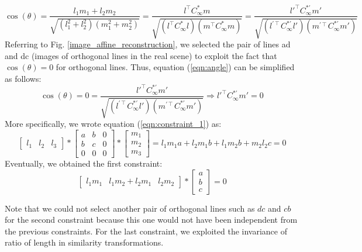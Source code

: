 \documentclass[11pt, oneside]{article}
\begin{document}
\begin{equation}
	\label{eqn:angle}
	\cos(\theta) = \frac{l_1 m_1 + l_2  m_2}{\sqrt{(l_1^2 + l_2^2)(m_1^2 + m_2 ^2)}}
	=
	\frac{l^\intercal C^{*}_\infty m}{\sqrt{(l^\intercal C^{*}_\infty l)(m^\intercal C^{*}_\infty m)}} 
	= 
	\frac{l{'^\intercal} C^{*'}_\infty m'}{\sqrt{(l^{'\intercal} C^{*'}_\infty l')(m^{'\intercal} C^{*'}_\infty m')}}
\end{equation}
Referring to Fig. \ref{image_affine_reconstruction}, we selected the pair of lines ad and dc (images of orthogonal lines in the real scene) to exploit the fact that $\cos(\theta) = 0$ for orthogonal lines. Thus, equation (\ref{eqn:angle}) can be simplified as follows:
\begin{equation}
	\label{eqn:constraint_1}
	\cos(\theta) = 0 =
	\frac{l{'^\intercal} C^{*'}_\infty m'}{\sqrt{(l^{'\intercal} C^{*'}_\infty l')(m^{'\intercal} C^{*'}_\infty m')}} 
	\Rightarrow
	l{'^\intercal} C^{*'}_\infty m' = 0
\end{equation}
More specifically, we wrote equation (\ref{eqn:constraint_1}) as:
\begin{equation}
	\begin{bmatrix}
		l_1 & l_2 & l_3
	\end{bmatrix}
	*
	\begin{bmatrix}
		a & b & 0 \\ b & c & 0 \\ 0 & 0 & 0
	\end{bmatrix} *
	\begin{bmatrix}
		m_1 \\ m_2 \\ m_3
	\end{bmatrix}
	= l_1 m_1 a + l_2 m_1 b + l_1 m_2 b + m_2 l_2 c = 0
\end{equation}
Eventually, we obtained the first constraint:
\begin{equation}
	\begin{bmatrix}
		l_1 m_1 & l_1 m_2 + l_2 m_1 & l_2 m_2
	\end{bmatrix}
	*
	\begin{bmatrix}
		a \\ b \\ c
	\end{bmatrix}
	= 0
\end{equation}

Note that we could not select another pair of orthogonal lines such as $dc$ and $cb$ for the second constraint because this one would not have been independent from the previous constraints. For the last constraint, we exploited the invariance of ratio of length in similarity transformations.
\end{document}

